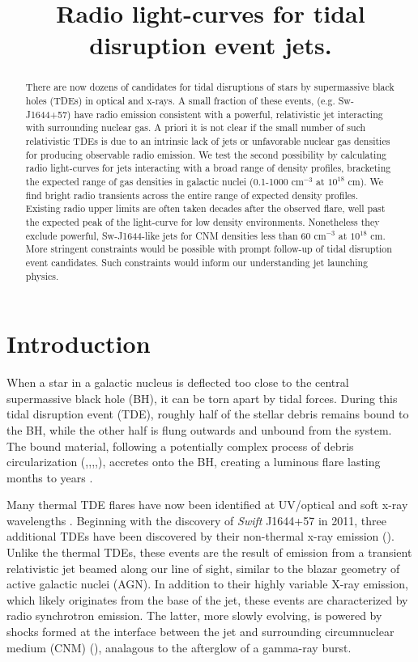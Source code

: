 \documentclass[usenatbib,fleqn]{mnras}
\title{Radio light-curves for tidal disruption event jets.}
\begin{document}
\begin{abstract}
  There are now dozens of candidates for tidal disruptions of stars by
  supermassive black holes (TDEs) in optical and x-rays. A small
  fraction of these events, (e.g. Sw-J1644+57) have radio emission
  consistent with a powerful, relativistic jet interacting with
  surrounding nuclear gas. A priori it is not clear if the small
  number of such relativistic TDEs is due to an intrinsic lack of jets
  or unfavorable nuclear gas densities for producing observable radio
  emission. We test the second possibility by calculating radio
  light-curves for jets interacting with a broad range of density
  profiles, bracketing the expected range of gas densities in galactic
  nuclei (0.1-1000 cm$^{-3}$ at $10^{18}$ cm). We find bright radio
  transients across the entire range of expected density
  profiles. Existing radio upper limits are often taken decades after
  the observed flare, well past the expected peak of the light-curve
  for low density environments. Nonetheless they exclude powerful,
  Sw-J1644-like jets for CNM densities less than 60 cm$^{-3}$ at
  $10^{18}$ cm. More stringent constraints would be possible with
  prompt follow-up of tidal disruption event candidates. Such
  constraints would inform our understanding jet launching physics.
\end{abstract}
\section{Introduction}
\label{sec:intro}
When a star in a galactic nucleus is deflected too close to the
central supermassive black hole (BH), it can be torn apart by tidal
forces.  During this tidal disruption event (TDE), roughly half of the
stellar debris remains bound to the BH, while the other half is flung
outwards and unbound from the system.  The bound material, following a
potentially complex process of debris circularization
(\citealt{Guillochon+2013},\citealt{Hayasaki+2013},\citealt{Hayasaki+2015},\citealt{Shiokawa+2015},\citealt{Bonnerot+2015}),
accretes onto the BH, creating a luminous flare lasting months to
years \citep{Hills1975, Carter+1982, Rees1988}.

Many thermal TDE flares have now been identified at UV/optical
\citep{van-Velzen+2011, Gezari+2012, Chornock+2014, Arcavi+2014} and
soft x-ray wavelengths \citep{Esquej+2007}.  Beginning with the
discovery of {\it Swift} J1644+57 in 2011, three additional TDEs have
been discovered by their non-thermal x-ray emission
(\citealt{Bloom+2011, Levan+2011, Burrows+2011, Zauderer+2011,
  Cenko+2012, Pasham+2015, Brown+2015}).  Unlike the thermal TDEs,
these events are the result of emission from a transient relativistic
jet beamed along our line of sight, similar to the blazar geometry of
active galactic nuclei (AGN).  In addition to their highly variable
X-ray emission, which likely originates from the base of the jet,
these events are characterized by radio synchrotron emission.  The
latter, more slowly evolving, is powered by shocks formed at the
interface between the jet and surrounding circumnuclear medium (CNM)
(\citealt{Giannios&Metzger2011,Metzger+2012}), analagous to the
afterglow of a gamma-ray burst.
\end{document}
